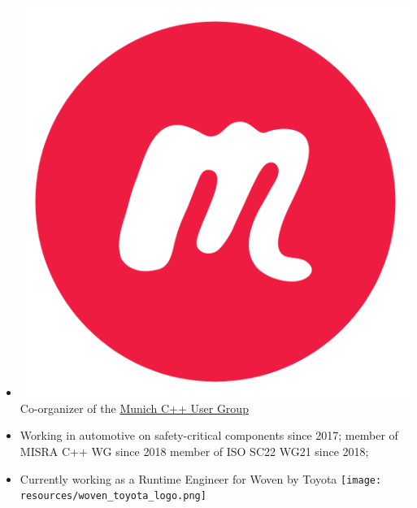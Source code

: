 \documentclass[aspectratio=169]{beamer}
\begin{document}
\begin{frame}[fragile]
\begin{itemize}
    \item \includegraphics[height=.05\textheight]{resources/meetup-icon.png} Co-organizer of the \href{https://www.meetup.com/MUCplusplus/}{Munich C++ User Group}
    
    \item Working in automotive on safety-critical components since 2017; member of MISRA C++ WG since 2018 member of ISO SC22 WG21 since 2018;

    \item Currently working as a Runtime Engineer for Woven by Toyota \texttt{[image: resources/woven\_toyota\_logo.png]}

  \end{itemize}
\end{frame}
\end{document}

